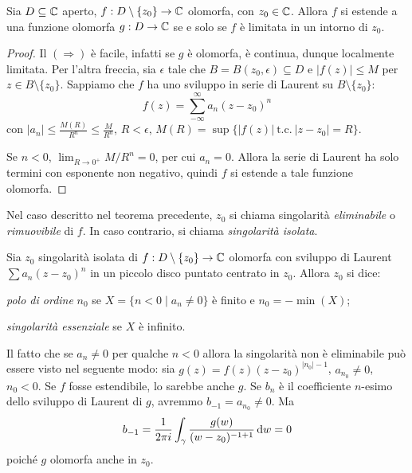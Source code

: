 \begin{thm}
    Sia $D\subseteq\mathbb{C}$ aperto, $f:D\setminus\{z_0\}\rightarrow\mathbb{C}$ olomorfa, con
    $z_0\in\mathbb{C}$. Allora $f$ si estende a una funzione olomorfa $g:D\rightarrow\mathbb{C}$
    se e solo se $f$ \`e limitata in un intorno di $z_0$.
\end{thm}
\begin{proof}
    Il $(\Rightarrow)$ \`e facile, infatti se $g$ \`e olomorfa, \`e continua,
    dunque localmente limitata. Per l'altra freccia, sia $\epsilon$ tale che
    $B = B(z_0,\epsilon)\subseteq D$ e $|f(z)|\leq M$ per $z\in B\setminus
    \{z_0\}$. Sappiamo che $f$ ha uno sviluppo in serie di Laurent su
    $B\setminus \{z_0\}$:
    \[
        f(z) = \sum_{-\infty}^\infty a_n (z-z_0)^n
    \]
    con $|a_n|\leq\frac{M(R)}{R^n} \leq \frac{M}{R^n}$, $R<\epsilon$, $M(R)=\sup\{|f(z)|\ \text{t.c.}\
    |z-z_0|=R\}$.

    Se $n<0$, $\lim_{R\rightarrow 0^+} M/R^n = 0$, per cui $a_n = 0$. Allora la
    serie di Laurent ha solo termini con esponente non negativo, quindi $f$ si
    estende a tale funzione olomorfa.
\end{proof}

\begin{defn}
    Nel caso descritto nel teorema precedente, $z_0$ si chiama singolarit\`a
    \textit{eliminabile} o \textit{rimuovibile} di $f$. In caso contrario, si chiama \textit{singolarit\`a
    isolata}.
\end{defn}

\begin{defn}
    Sia $z_0$ singolarit\`a isolata di $f:D\setminus\{z_0\}\rightarrow\mathbb{C}$
    olomorfa con sviluppo di Laurent $\sum a_n (z-z_0)^n$ in un piccolo disco
    puntato centrato in $z_0$. Allora $z_0$ si dice:
    \begin{nlist}
        \item
            \textit{polo di ordine} $n_0$ se $X=\{n<0 \mid a_n\neq 0\}$ \`e finito e
            $n_0 = -\min(X)$;
        \item
            \textit{singolarit\`a essenziale} se $X$ \`e infinito.
    \end{nlist}
\end{defn}

\begin{oss}
    Il fatto che se $a_n\neq 0 $ per qualche $n<0$ allora la singolarit\`a non
    \`e eliminabile pu\`o essere visto nel seguente modo: sia $g(z) =
    f(z)(z-z_0)^{|n_0|-1}$, $a_{n_0}\neq 0$, $n_0<0$. Se $f$ fosse estendibile,
    lo sarebbe anche $g$. Se $b_n$ \`e il coefficiente $n$-esimo dello sviluppo
    di Laurent di $g$, avremmo $b_{-1} = a_{n_0} \neq 0$.
    Ma
    \[
        b_{-1} = \frac{1}{2\pi i} \int_\gamma \frac{g(w)}{(w-z_0)^{-1+1}} \mathop{}\!\mathrm{d} w= 0
    \]
    poich\'e $g$ olomorfa anche in $z_0$.
\end{oss}

